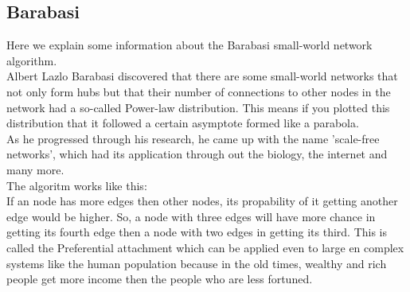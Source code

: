 \documentclass[a4paper]{article}
\theoremstyle{definition}
\begin{document}
\newpage
\subsection{Barabasi}
Here we explain some information about the Barabasi small-world network
algorithm.\\

Albert Lazlo Barabasi discovered that there are some small-world networks
that not only form hubs but that their number of connections to other nodes
in the network had a so-called Power-law distribution. This means if you
plotted this distribution that it followed a certain asymptote formed like a
parabola.\\

As he progressed through his research, he came up with the name 'scale-free
networks', which had its application through out the biology, the internet
and many more.\\

The algoritm works like this:\\

If an node has more edges then other nodes, its propability of it getting
another edge would be higher. So, a node with three edges will have more
chance in getting its fourth edge then a node with two edges in getting its
third. This is called the Preferential attachment which can be applied even
to large en complex systems like the human population because in the old
times, wealthy and rich people get more income then the people who are less
fortuned.\\

\newpage
\end{document}
